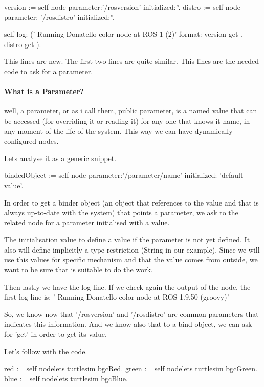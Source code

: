 \documentclass[a4paper,10pt,twoside]{book}
\begin{document}
		
		
		\begin{code}
	version := self node parameter:'/rosversion' initialized:''.
	distro := self node parameter: '/rosdistro'	initialized:''.

	self log: (' Running Donatello color node at ROS {1} ({2})' format: { version get . distro get }).

		\end{code}
		
		This lines are new. The first two lines are quite similar. This lines are the needed code to ask for a parameter. 
		\paragraph{What is a Parameter?} well, a parameter, or as i call them, public parameter, is a named value that can be accessed (for overriding it or reading it) for any one that knows it name, in any moment of the life of the system.
		This way we can have dynamically configured nodes. 
		
		Lets analyse it as a generic snippet.
		
		
		 \begin{code}
	bindedObject := self node parameter:'/parameter/name' initialized: 'default value'.
		\end{code}
		
		In order to get a binder object (an object that references to the value and that is always up-to-date with the system) that points a parameter, we ask to the related node for a parameter initialised with a value. 
		
		The initialisation value to define a value if the parameter is not yet defined. It also will define implicitly a type restriction (String in our example). Since we will use this values for specific mechanism and that the value comes from outside, we want to be sure that is suitable to do the work.
		
		
		Then lastly we have the log line. If we check again the output of the node, the first log line is: ' Running Donatello color node at ROS 1.9.50 (groovy)'
		
		So, we know now that '/rosversion' and '/rosdistro' are common parameters that indicates this information.
		And we know also that to a bind object, we can ask for 'get' in order to get its value.
		
		
		Let's follow with the code. 
		
		\begin{code}
	
	red :=  self nodelets turtlesim bgcRed.
	green :=  self nodelets turtlesim bgcGreen.
	blue :=  self nodelets turtlesim bgcBlue.

		\end{code}
		
\end{document}
